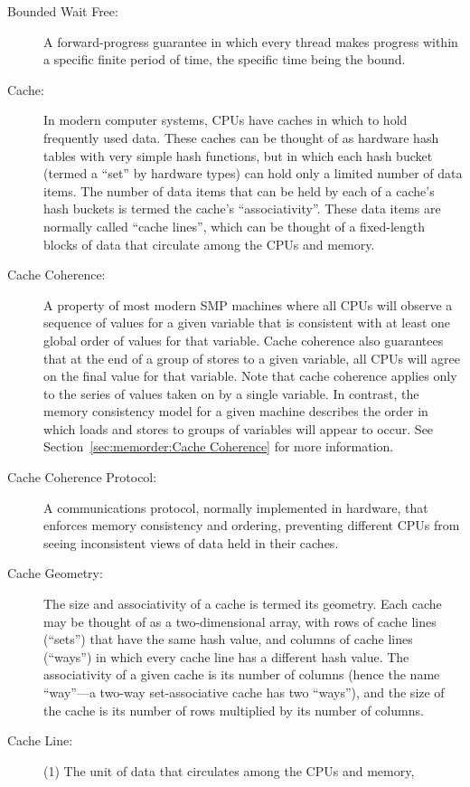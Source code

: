 \begin{description}
\item[Bounded Wait Free:]
	A forward-progress guarantee in which every thread makes
	progress within a specific finite period of time, the specific
	time being the bound.
\item[Cache:]
	In modern computer systems, CPUs have caches in which to hold
	frequently used data.
	These caches can be thought of as hardware hash tables with very
	simple hash functions,
	but in which each hash bucket (termed a ``set'' by hardware types)
	can hold only a limited number of data items.
	The number of data items that can be held by each of a cache's hash
	buckets is termed the cache's ``associativity''.
	These data items are normally called ``cache lines'', which
	can be thought of a fixed-length blocks of data that circulate
	among the CPUs and memory.
\item[Cache Coherence:]
	A property of most modern SMP machines where all CPUs will
	observe a sequence of values for a given variable that is
	consistent with at least one global order of values for
	that variable.
	Cache coherence also guarantees that at the end of a group
	of stores to a given variable, all CPUs will agree
	on the final value for that variable.
	Note that cache coherence applies only to the series of values
	taken on by a single variable.
	In contrast, the memory consistency model for a given machine
	describes the order in which loads and stores to groups of
	variables will appear to occur.
	See Section~\ref{sec:memorder:Cache Coherence}
	for more information.
\item[Cache Coherence Protocol:]
	A communications protocol, normally implemented in hardware,
	that enforces memory consistency and ordering, preventing
	different CPUs from seeing inconsistent views of data held
	in their caches.
\item[Cache Geometry:]
	The size and associativity of a cache is termed its geometry.
	Each cache may be thought of as a two-dimensional array,
	with rows of cache lines (``sets'') that have the same hash
	value, and columns of cache lines (``ways'') in which every
	cache line has a different hash value.
	The associativity of a given cache is its number of
	columns (hence the name ``way''---a two-way set-associative
	cache has two ``ways''), and the size of the cache is its
	number of rows multiplied by its number of columns.
\item[Cache Line:]
	(1) The unit of data that circulates among the CPUs and memory,

\end{description}

